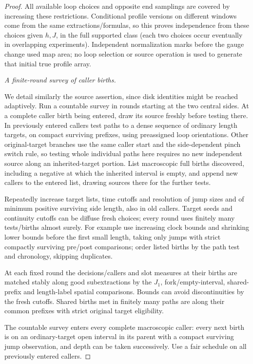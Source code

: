 \begin{proof}
All available loop choices and opposite end samplings are covered by increasing these restrictions.
Conditional profile versions on different windows come from the same extractions/formulas, so this
proves independence from these choices given \(h,J\), in the full supported class (each two choices
occur eventually in overlapping experiments). Independent normalization marks before the gauge
change used map area; no loop selection or source operation is used to generate that initial true
profile array.

\smallskip\noindent\emph{A finite-round survey of caller births.}\par

We detail similarly the source assertion, since disk identities might be reached adaptively. Run a
countable survey in rounds starting at the two central sides. At a complete caller birth being
entered, draw its source freshly before testing there. In previously entered callers test paths to a
dense sequence of ordinary length targets, on compact surviving prefixes, using preassigned loop
orientations. Other original-target branches use the same caller start and the side-dependent pinch
switch rule, so testing whole individual paths here requires no new independent source along an
inherited-target portion. List macroscopic full births discovered, including a negative at which the
inherited interval is empty, and append new callers to the entered list, drawing sources there for
the further tests.

Repeatedly increase target lists, time cutoffs and resolution of jump sizes and of minimum positive
surviving side length, also in old callers. Target seeds and continuity cutoffs can be diffuse fresh
choices; every round uses finitely many tests/births almost surely. For example use increasing clock
bounds and shrinking lower bounds before the first small length, taking only jumps with strict
compactly surviving pre/post comparisons; order listed births by the path test and chronology,
skipping duplicates.

At each fixed round the decisions/callers and slot measures at their births are matched stably along
good subextractions by the \(J_1\), fork/empty-interval, shared-prefix and length-label spatial
comparisons. Bounds can avoid discontinuities by the fresh cutoffs. Shared births met in finitely
many paths are along their common prefixes with strict original target eligibility.

The countable survey enters every complete macroscopic caller: every next birth is on an
ordinary-target open interval in its parent with a compact surviving jump observation, and depth can
be taken successively. Use a fair schedule on all previously entered callers.


\end{proof}
